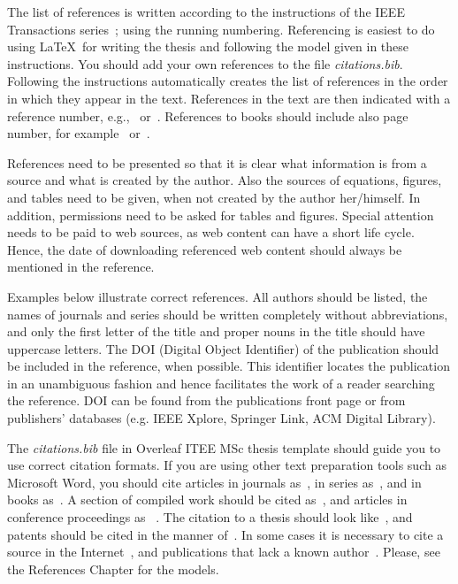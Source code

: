 The list of references is written according to the instructions of the IEEE Transactions series~\cite{ieeetransactions}; using the running numbering. Referencing is easiest to do using \LaTeX\ for writing the thesis and following the model given in these instructions. You should add your own references to the file \textit{citations.bib}. Following the instructions automatically creates the list of references in the order in which they appear in the text. References in the text are then indicated with a reference number, e.g.,~\cite{lappalainen} or~\cite{lappalainen, acta, korpela}. References to books should include also page number, for example~\cite[p.\ 15]{lappalainen} or~\cite[pp.\ 15--17]{lappalainen}.

References need to be presented so that it is clear what information is from a source and what is created by the author. Also the sources of equations, figures, and tables need to be given, when not created by the author her/himself. In addition, permissions need to be asked for tables and figures. Special attention needs to be paid to web sources, as web content can have a short life cycle. Hence, the date of downloading referenced web content should always be mentioned in the reference.

Examples below illustrate correct references. All authors should be listed, the names of journals and series should be written completely without abbreviations, and only the first letter of the title and proper nouns in the title should have uppercase letters. The DOI (Digital Object Identifier) of the publication should be included in the reference, when possible. This identifier locates the publication in an unambiguous fashion and hence facilitates the work of a reader searching the reference. DOI can be found from the publications front page or from publishers’ databases (e.g. IEEE Xplore, Springer Link, ACM Digital Library).

The \textit{citations.bib} file in Overleaf ITEE MSc thesis template should guide you to use correct citation formats. If you are using other text preparation tools such as Microsoft Word, you should cite articles in journals  as~\cite{ojala:2002}, in series as~\cite{riekki:1998}, and in books as~\cite{pietikainen:2011}. A section of compiled work should be cited as~\cite{cvejic:2005}, and articles in conference proceedings as ~\cite{heikkila:1997}. The citation to a thesis should look like~\cite{heikkinen:2011}, and patents should be cited in the manner of~\cite{toivonen:2004}. In some cases it is necessary to cite a source in the Internet~\cite{korpela}, and publications that lack a known author~\cite{asuntoliitto_asumistaso_1969}. Please, see the References Chapter for the models.


